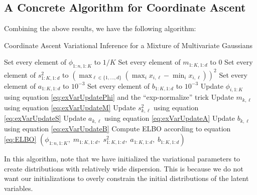 \documentclass[11pt]{article}
\begin{document}
\needspace{0.25\textheight}
\subsection{A Concrete Algorithm for Coordinate Ascent}

Combining the above results, we have the following algorithm:

\begin{algorithm}[!ht]
\caption{Coordinate Ascent Variational Inference for a Mixture of Multivariate Gaussians}
\begin{algorithmic}
    \State Set every element of $\phi_{1:n,1:K}$ to $1/K$
    \State Set every element of $m_{1:K,1:d}$ to $0$
    \State Set every element of $s_{1:K,1:d}^2$ to $(\max_{\ell \in \{1, \ldots, d\}} (\max_i x_{i,\ell} - \min_i x_{i,\ell}))^2$
    \State Set every element of $a_{1:K,1:d}$ to $10^{-3}$
    \State Set every element of $b_{1:K,1:d}$ to $10^{-3}$
            \State Update $\phi_{i,1:K}$ using equation \eqref{eq:exVarUpdatePhi} and the ``exp-normalize'' trick
        \EndFor
                \State Update $m_{k,\ell}$ using equation \eqref{eq:exVarUpdateM}
                \State Update $s_{k,\ell}^2$ using equation \eqref{eq:exVarUpdateS}
                \State Update $a_{k,\ell}$ using equation \eqref{eq:exVarUpdateA}
                \State Update $b_{k,\ell}$ using equation \eqref{eq:exVarUpdateB}
            \EndFor
        \EndFor
        \State Compute ELBO according to equation \eqref{eq:ELBO}
    \EndWhile
    \State \Return $(\phi_{1:n,1:K}, \;
                     m_{1:K,1:d}, \;
                     s_{1:K,1:d}^2, \;
                     a_{1:K,1:d}, \;
                     b_{1:K,1:d})$
\EndFunction
\end{algorithmic}
\end{algorithm}

In this algorithm, note that we have initialized the variational parameters to create distributions with relatively wide dispersion.
This is because we do not want our initializations to overly constrain the initial distributions of the latent variables.





\end{document}
